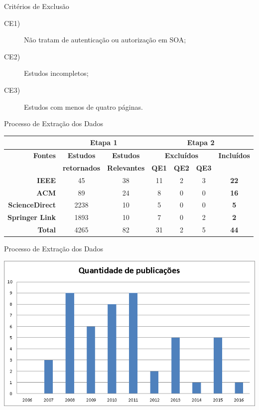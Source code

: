 \documentclass[aspectratio=169, newPxFont]{beamer}
\begin{document}
\begin{frame}{Critérios de Exclusão}
	\begin{description}
		\item [CE1)]Não tratam de autenticação ou autorização em SOA;
		\item [CE2)]Estudos incompletos;
		\item [CE3)]Estudos com menos de quatro páginas.
	\end{description}
\end{frame}



\begin{frame}{Processo de Extração dos Dados}
	\begin{table}[htbp]
		\centering
		\begin{tabular}{r|c|c|ccc|c}
			\toprule
			\textbf{}&\multicolumn{2}{c}{\textbf{Etapa 1}} & \multicolumn{4}{c}{\textbf{Etapa 2}} \\
			\midrule
			\textbf{Fontes} & \textbf{Estudos} & \textbf{Estudos} & \multicolumn{3}{c}{\textbf{Excluídos}} & \textbf{Incluídos} \\
			\textbf{} & \textbf{retornados} & \textbf{Relevantes} & \textbf{QE1} & \textbf{QE2} & \textbf{QE3} & \textbf{} \\
			\textbf{IEEE} & 45    & 38    & 11     & 2     & 3     & \multicolumn{1}{c}{\textbf{22}} \\
			\textbf{ACM} & 89    & 24    & 8     & 0     & 0     & \multicolumn{1}{c}{\textbf{16}} \\
			\textbf{ScienceDirect} & 2238  & 10    & 5     & 0     & 0     & \multicolumn{1}{c}{\textbf{5}} \\
			\textbf{Springer Link} & 1893  & 10     & 7     & 0     & 2     & \multicolumn{1}{c}{\textbf{2}} \\ 
			\midrule
			\textbf{Total} & 4265  & 82    & 31    & 2     & 5     & \multicolumn{1}{c}{\textbf{44}} \\
			\bottomrule
		\end{tabular}%
		\label{tab:addlabel}%
	\end{table}%
\end{frame}


\begin{frame}{Processo de Extração dos Dados}
			\begin{center}
				\includegraphics[scale = 0.65]{img/ano.png}
			\end{center}
\end{frame}
\end{document}
